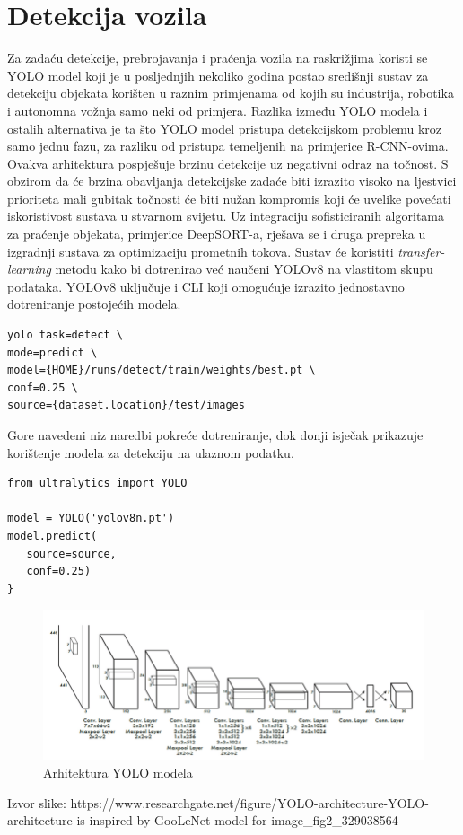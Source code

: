 \documentclass[seminarski, times, utf8]{fer}
\begin{document}
\section{Detekcija vozila}
Za zadaću detekcije, prebrojavanja i praćenja vozila na raskrižjima koristi se YOLO model koji je u posljednjih nekoliko godina postao središnji sustav za detekciju objekata korišten u raznim primjenama od kojih su industrija, robotika i autonomna vožnja samo neki od primjera. \citep{make5040083}
Razlika između YOLO modela i ostalih alternativa je ta što YOLO model pristupa detekcijskom problemu kroz samo jednu fazu, za razliku od pristupa temeljenih na primjerice R-CNN-ovima. Ovakva arhitektura pospješuje brzinu detekcije uz negativni odraz na točnost. \citep{folio3_yolov8} S obzirom da će brzina obavljanja detekcijske zadaće biti izrazito visoko na ljestvici prioriteta mali gubitak točnosti će biti nužan kompromis koji će uvelike povećati iskoristivost sustava u stvarnom svijetu. Uz integraciju sofisticiranih algoritama za praćenje objekata, primjerice DeepSORT-a, rješava se i druga prepreka u izgradnji sustava za optimizaciju prometnih tokova. Sustav će koristiti \textit{transfer-learning} metodu kako bi dotrenirao već naučeni YOLOv8 na vlastitom skupu podataka. YOLOv8 uključuje i CLI koji omogućuje izrazito jednostavno dotreniranje postojećih modela.
\begin{verbatim}
yolo task=detect \
mode=predict \
model={HOME}/runs/detect/train/weights/best.pt \
conf=0.25 \
source={dataset.location}/test/images
\end{verbatim}
\begin{flushleft}
  \small
Gore navedeni niz naredbi pokreće dotreniranje, dok donji isječak prikazuje korištenje modela za detekciju na ulaznom podatku.
\end{flushleft}
\begin{verbatim}
from ultralytics import YOLO

model = YOLO('yolov8n.pt')
model.predict(
   source=source,
   conf=0.25)
}

\end{verbatim}
 
\begin{figure}[H]
   \centering
   \includegraphics[width=0.7\linewidth]{slike/img2.png}
   \caption{Arhitektura YOLO modela \citep{article}}
   \label{fig:yolo}
\end{figure}
\begin{flushleft}
  \small
  Izvor slike: https://www.researchgate.net/figure/YOLO-architecture-YOLO-architecture-is-inspired-by-GooLeNet-model-for-image\_fig2\_329038564
\end{flushleft}
\end{document}
